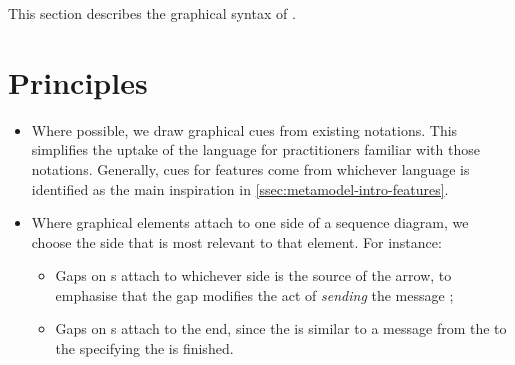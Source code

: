 This section describes the graphical syntax of \langname.


\section{Principles}


\begin{itemize}
\item Where possible, we draw graphical cues from existing notations.
  This simplifies the uptake of the language for practitioners
  familiar with those notations.  Generally, cues for features come
  from whichever language is identified as the main inspiration in
  \cref{ssec:metamodel-intro-features}.
\item Where graphical elements attach to one side of a sequence diagram,
  we choose the side that is most relevant to that element.  For instance:
  \begin{itemize}
  \item Gaps on \marrowaction s attach to whichever
    side is the source of the arrow, to emphasise that the gap modifies
    the act of \emph{sending} the message ;
  \item Gaps on \mfinalaction s attach to the \mtarget{} end,
    since the \mfinalaction{} is similar to a message from the \mtarget{} to
    the \mworld{} specifying the \mtarget{} is finished.
  \end{itemize}
\end{itemize}

